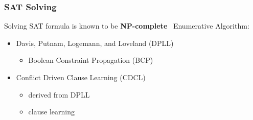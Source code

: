 \documentclass{beamer}
\begin{document}
\begin{frame}
\frametitle{SAT Solving}

	Solving SAT formula is known to be \textbf{NP-complete}~\cite{cook1971complexity}
	\vfill
	Enumerative Algorithm:
	\begin{itemize}
		\item Davis, Putnam, Logemann, and Loveland (DPLL)~\cite{dpll_62}
		\begin{itemize}
			\item Boolean Constraint Propagation (BCP)
		\end{itemize}
		\item Conflict Driven Clause Learning (CDCL)~\cite{marques1999grasp}
		\begin{itemize}
			\item derived from DPLL
			\item clause learning
		\end{itemize}
	\end{itemize}
	
\end{frame}
\end{document}
